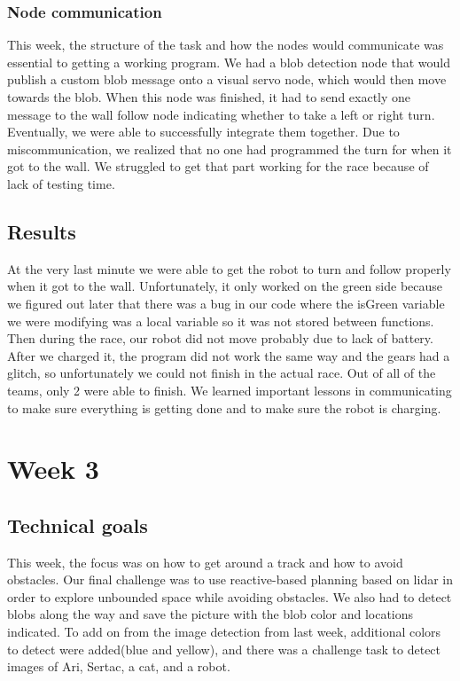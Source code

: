 \documentclass[journal, a4paper]{IEEEtran}
\begin{document}
\subsubsection{Node communication}This week, the structure of the task and how the nodes would communicate was essential to getting a working program. We had a blob detection node that would publish a custom blob message onto a visual servo node, which would then move towards the blob. When this node was finished, it had to send exactly one message to the wall follow node indicating whether to take a left or right turn. Eventually, we were able to successfully integrate them together. Due to miscommunication, we realized that no one had programmed the turn for when it got to the wall. We struggled to get that part working for the race because of lack of testing time. 
\subsection{Results}
At the very last minute we were able to get the robot to turn and follow properly when it got to the wall. Unfortunately, it only worked on the green side because we figured out later that there was a bug in our code where the isGreen variable we were modifying was a local variable so it was not stored between functions. Then during the race, our robot did not move probably due to lack of battery. After we charged it, the program did not work the same way and the gears had a glitch, so unfortunately we could not finish in the actual race. Out of all of the teams, only 2 were able to finish. We learned important lessons in communicating to make sure everything is getting done and to make sure the robot is charging. 
\section{Week 3}
\subsection{Technical goals}
This week, the focus was on how to get around a track and how to avoid obstacles. Our final challenge was to use reactive-based planning based on lidar in order to explore unbounded space while avoiding obstacles. We also had to detect blobs along the way and save the picture with the blob color and locations indicated. To add on from the image detection from last week, additional colors to detect were added(blue and yellow), and there was a challenge task to detect images of Ari, Sertac, a cat, and a robot. 
\end{document}
